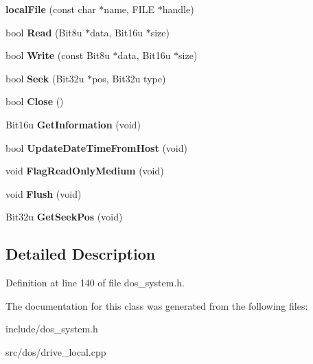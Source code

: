 \begin{DoxyCompactItemize}
\item 
\hypertarget{classlocalFile_ab28a6808847aceacff4d4405cb618bab}{{\bfseries local\-File} (const char $\ast$name, F\-I\-L\-E $\ast$handle)}\label{classlocalFile_ab28a6808847aceacff4d4405cb618bab}

\item 
\hypertarget{classlocalFile_a558f7d758b8818237b26722c466f0f49}{bool {\bfseries Read} (Bit8u $\ast$data, Bit16u $\ast$size)}\label{classlocalFile_a558f7d758b8818237b26722c466f0f49}

\item 
\hypertarget{classlocalFile_a692068e0eb68eaa11661f2246270af1c}{bool {\bfseries Write} (const Bit8u $\ast$data, Bit16u $\ast$size)}\label{classlocalFile_a692068e0eb68eaa11661f2246270af1c}

\item 
\hypertarget{classlocalFile_ab661b8383ca8cf945056571ca982912a}{bool {\bfseries Seek} (Bit32u $\ast$pos, Bit32u type)}\label{classlocalFile_ab661b8383ca8cf945056571ca982912a}

\item 
\hypertarget{classlocalFile_a29a72ec4be5c9f3b0196f2f4d47f5f54}{bool {\bfseries Close} ()}\label{classlocalFile_a29a72ec4be5c9f3b0196f2f4d47f5f54}

\item 
\hypertarget{classlocalFile_a970064b86d4966929fae874542104cba}{Bit16u {\bfseries Get\-Information} (void)}\label{classlocalFile_a970064b86d4966929fae874542104cba}

\item 
\hypertarget{classlocalFile_a6ddb9040bcee2bfb3673228b47042e89}{bool {\bfseries Update\-Date\-Time\-From\-Host} (void)}\label{classlocalFile_a6ddb9040bcee2bfb3673228b47042e89}

\item 
\hypertarget{classlocalFile_a48ed18aa11972f7236cc34928387ff32}{void {\bfseries Flag\-Read\-Only\-Medium} (void)}\label{classlocalFile_a48ed18aa11972f7236cc34928387ff32}

\item 
\hypertarget{classlocalFile_a6fc67afa9e37a05b353d4376a714d495}{void {\bfseries Flush} (void)}\label{classlocalFile_a6fc67afa9e37a05b353d4376a714d495}

\item 
\hypertarget{classlocalFile_ac0b74c929048947e12d164a0430d32e2}{Bit32u {\bfseries Get\-Seek\-Pos} (void)}\label{classlocalFile_ac0b74c929048947e12d164a0430d32e2}

\end{DoxyCompactItemize}


\subsection{Detailed Description}


Definition at line 140 of file dos\-\_\-system.\-h.



The documentation for this class was generated from the following files\-:\begin{DoxyCompactItemize}
\item 
include/dos\-\_\-system.\-h\item 
src/dos/drive\-\_\-local.\-cpp\end{DoxyCompactItemize}
